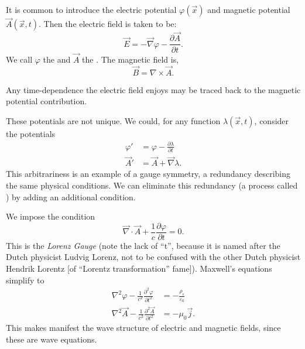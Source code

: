 It is common to introduce the electric potential $\varphi(\vec{x})$
and magnetic potential $\vec{A}(\vec{x}, t)$. Then the electric field is
taken to be:
\begin{equation}
\vec{E} = -\vec{\nabla}\varphi - \frac{\partial\vec{A}}{\partial t}.
\end{equation}
We call $\varphi$ the  and $\vec{A}$ the
.
The magnetic field is,
\begin{equation}
\vec{B} = \nabla\times\vec{A}.
\end{equation}

\begin{remark}
Any time-dependence the electric field enjoys may be traced back to the
magnetic potential contribution.
\end{remark}

These potentials are not unique. We could, for any function
$\lambda(\vec{x},t)$, consider the potentials
\begin{subequations}
\begin{align}
\varphi' &= \varphi - \frac{\partial\lambda}{\partial t}\\
\vec{A}' &= \vec{A} + \vec{\nabla}\lambda.
\end{align}
\end{subequations}
This arbitrariness is an example of a gauge symmetry, a redundancy
describing the same physical conditions. We can eliminate this
redundancy (a process called ) by adding an
additional condition.

We impose the condition
\begin{equation}
\vec{\nabla}\cdot\vec{A} + \frac{1}{c}\frac{\partial\varphi}{\partial t}=0.
\end{equation}
This is the \emph{Lorenz Gauge} (note the lack of ``t'', because it is
named after the Dutch physicist Ludvig Lorenz, not to be confused with
the other Dutch physicist Hendrik Lorentz [of ``Lorentz transformation''
fame]). Maxwell's equations
simplify to 
\begin{subequations}
\begin{align}
\nabla^{2}\varphi - \frac{1}{c^{2}}\frac{\partial^{2}\varphi}{\partial t^{2}}
&= -\frac{\rho_{e}}{\varepsilon_{0}}\\
\nabla^{2}\vec{A} - \frac{1}{c^{2}}\frac{\partial^{2}\vec{A}}{\partial t^{2}}
&= -\mu_{0}\vec{j}.
\end{align}
\end{subequations}
This makes manifest the wave structure of electric and magnetic fields,
since these are wave equations.

